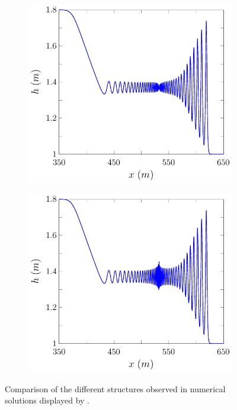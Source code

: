 \begin{figure}
\begin{subfigure}{0.5\textwidth}
		\vspace{0.5cm}
	\end{subfigure}
	\begin{subfigure}{0.5\textwidth}
		\includegraphics[width=\textwidth]{./chp2/figures/DamBreakStruct/9.pdf}
		\vspace{0.5cm}
	\end{subfigure}%
	\begin{subfigure}{0.5\textwidth}
		\includegraphics[width=\textwidth]{./chp2/figures/DamBreakStruct/20.pdf}
		\vspace{0.5cm}
	\end{subfigure}
	\caption{Comparison of the different structures observed in numerical solutions displayed by \citet{Pitt-2018-61}.}
	\label{fig:DBExAll}
\end{figure}

